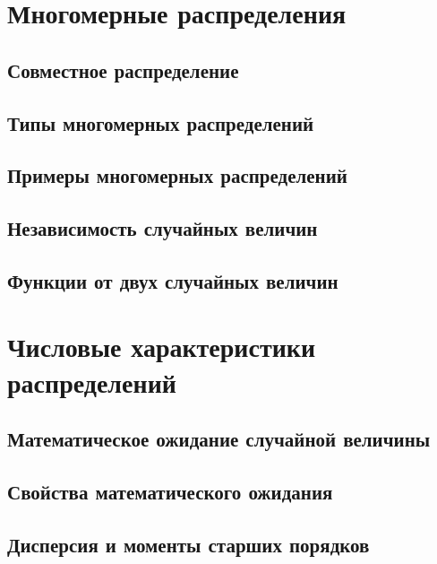 \section{\xmark Многомерные распределения}


\subsection{Совместное распределение}


\subsection{Типы многомерных распределений}


\subsection{Примеры многомерных распределений}




\subsection{Независимость случайных величин}


\subsection{Функции от двух случайных величин}



\section{Числовые характеристики распределений}

\subsection{Математическое ожидание случайной величины}


\subsection{Свойства математического ожидания}


\subsection{Дисперсия и моменты старших порядков}


